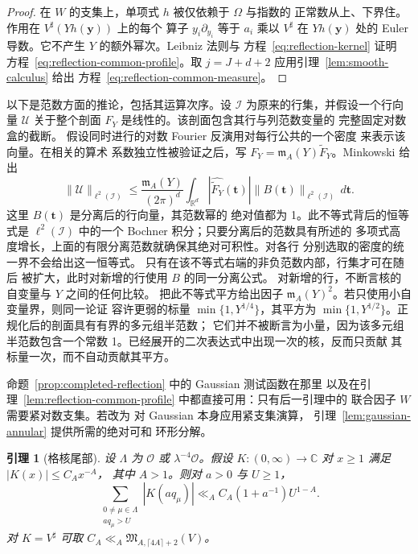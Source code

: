 \documentclass[11pt,a4paper]{article}
\numberwithin{equation}{section}
\numberwithin{figure}{section}
\newtheorem{lemma}[theorem]{引理}
\theoremstyle{definition}
\theoremstyle{remark}
\begin{document}
\begin{proof}
在 $W$ 的支集上，单项式 $h$ 被仅依赖于 $\Omega$ 与指数的
正常数从上、下界住。作用在 $V^\sharp(Yh(\boldsymbol y))$ 上的每个
算子 $y_i\partial_{y_i}$ 等于 $a_i$ 乘以 $V^\sharp$ 在 $Yh(\boldsymbol y)$ 处的
Euler 导数。它不产生 $Y$ 的额外幂次。Leibniz 法则与
方程~\eqref{eq:reflection-kernel} 证明
方程~\eqref{eq:reflection-common-profile}。取
$j=J+d+2$ 应用引理~\ref{lem:smooth-calculus} 给出
方程~\eqref{eq:reflection-common-measure}。
\end{proof}

以下是范数方面的推论，包括其运算次序。设
$\mathcal I$ 为原来的行集，并假设一个行向量 $\mathcal U$
关于整个剖面 $F_Y$ 是线性的。该剖面包含其行与列范数变量的
完整固定对数盒的截断。
假设同时进行的对数 Fourier 反演用对每行公共的一个密度
来表示该向量。在相关的算术
系数独立性被验证之后，写
$F_Y=\mathfrak m_A(Y)\widetilde F_Y$。Minkowski 给出
\begin{equation}\label{eq:reflection-common-minkowski}
 \|\mathcal U\|_{\ell^2(\mathcal I)}
 \le \frac{\mathfrak m_A(Y)}{(2\pi)^d}
       \int_{\mathbb R^d}|\widehat{\widetilde F_Y}(\boldsymbol t)|
       \|B(\boldsymbol t)\|_{\ell^2(\mathcal I)}\,d\boldsymbol t.
\end{equation}
这里 $B(\boldsymbol t)$ 是分离后的行向量，其范数幂的
绝对值都为 1。此不等式背后的恒等式是
$\ell^2(\mathcal I)$ 中的一个 Bochner 积分；只要分离后的范数具有所述的
多项式高度增长，上面的有限分离范数就确保其绝对可积性。对各行
分别选取的密度的统一界不会给出这一恒等式。
只有在该不等式右端的非负范数内部，行集才可在随后
被扩大，此时对新增的行使用 $B$ 的同一分离公式。
对新增的行，不断言核的自变量与 $Y$ 之间的任何比较。
把此不等式平方给出因子
$\mathfrak m_A(Y)^2$。若只使用小自变量界，则同一论证
容许更弱的标量 $\min\{1,Y^{1/4}\}$，其平方为
$\min\{1,Y^{1/2}\}$。正规化后的剖面具有有界的多元组半范数；
它们并不被断言为小量，因为该多元组半范数包含一个常数
1。已经展开的二次表达式中出现一次的核，反而只贡献
其标量一次，而不自动贡献其平方。

命题~\ref{prop:completed-reflection} 中的 Gaussian 测试函数在那里
以及在引理~\ref{lem:reflection-common-profile} 中都直接可用：只有后一引理中的
联合因子 $W$ 需要紧对数支集。若改为
对 Gaussian 本身应用紧支集演算，
引理~\ref{lem:gaussian-annular} 提供所需的绝对可和
环形分解。

\begin{lemma}[格核尾部]\label{lem:lattice-kernel-tail}
设 $\Lambda$ 为 $\mathcal O$ 或 $\lambda^{-4}\mathcal O$。假设
$K:(0,\infty)\to\mathbb C$ 对 $x\ge1$ 满足 $|K(x)|\le C_Ax^{-A}$，
其中 $A>1$。则对 $a>0$ 与 $U\ge1$，
\begin{equation}\label{eq:lattice-kernel-tail}
 \sum_{\substack{0\ne\mu\in\Lambda\\a q_\mu>U}}|K(aq_\mu)|
 \ll_A C_A(1+a^{-1})U^{1-A}.
\end{equation}
对 $K=V^\sharp$ 可取
$C_A\ll_A\mathfrak M_{A,\lceil4A\rceil+2}(V)$。
\end{lemma}
\end{document}
